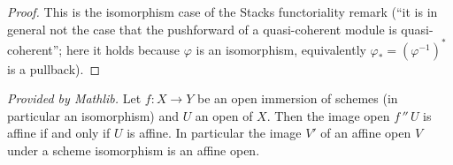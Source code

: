 \begin{proof}
  This is the isomorphism case of the Stacks functoriality remark (``it is in general not the case that
  the pushforward of a quasi-coherent module is quasi-coherent''; here it holds because \(\varphi\) is an
  isomorphism, equivalently \(\varphi_* = (\varphi^{-1})^*\) is a pullback).
\end{proof}

\begin{lemma}
  \label{lem:isAffineOpen_image_of_iso_mathlib}
  \mathlibok
  \textit{Provided by Mathlib.}
  Let \(f : X \to Y\) be an open immersion of schemes (in particular an isomorphism) and \(U\) an open
  of \(X\). Then the image open \(f \,{''}\, U\) is affine if and only if \(U\) is affine. In
  particular the image \(V'\) of an affine open \(V\) under a scheme isomorphism is an affine open.
\end{lemma}


